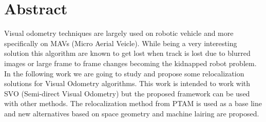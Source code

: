 
 \setcounter{tocdepth}{2}
 \tableofcontents
 \cleardoublepage






\chapter*{Abstract}

 Visual odometry techniques  are largely used on robotic vehicle and more specifically on MAVs (Micro Aerial Veicle). While being a very interesting solution this algorithm are known to get lost when track is lost due to blurred images or large frame to frame changes becoming the kidnapped robot problem. In the following work we are going to study and propose some relocalization solutions for Visual Odometry algorithms. This work is intended to work with SVO (Semi-direct Visual Odometry) but the proposed framework can be used with other methods. The relocalization method from PTAM is used as a base line and new alternatives based on space geometry and machine lairing are proposed.

 \cleardoublepage


